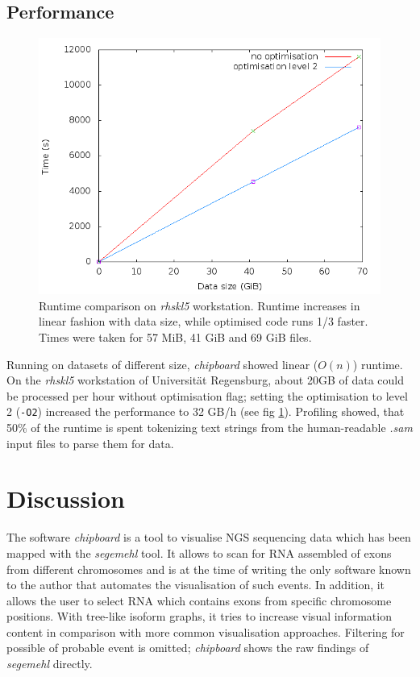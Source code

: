 \documentclass[11pt]{article}
\begin{document}
\subsection{Performance}
\label{sec-3-3}

\begin{figure}[htb]
\centering
\includegraphics[width=.9\linewidth]{./times.png}
\caption[Runtime comparison]{Runtime comparison on \textit{rhskl5} workstation. Runtime increases in linear fashion with data size, while optimised code runs 1/3 faster. Times were taken for 57 MiB, 41 GiB and 69 GiB files.}\label{fig:times}
\end{figure}


Running on datasets of different size, \emph{chipboard} showed linear ($O(n)$) runtime.
On the \emph{rhskl5} workstation of Universität Regensburg, about 20GB of data could be processed per
hour without optimisation flag; setting the optimisation to level 2 (\texttt{-O2}) increased the
performance to 32 GB/h (see fig \ref{fig:times}).
Profiling showed, that 50\% of the runtime is spent tokenizing text strings from the
human-readable \emph{.sam} input files to parse them for data.


\clearpage

\section{Discussion}
\label{sec-4}

The software \emph{chipboard} is a tool to visualise NGS sequencing data which has been mapped with
the \emph{segemehl} tool. It allows to scan for RNA assembled of exons from different chromosomes 
and is at the time of writing the only software known to the author that automates the 
visualisation of such events.
In addition, it allows the user to select RNA which contains exons from specific chromosome
positions. With tree-like isoform graphs, it tries to increase visual information content in 
comparison with more common visualisation approaches.
Filtering for possible of probable event is omitted; \emph{chipboard} shows the raw findings of
\emph{segemehl} directly.
\end{document}
